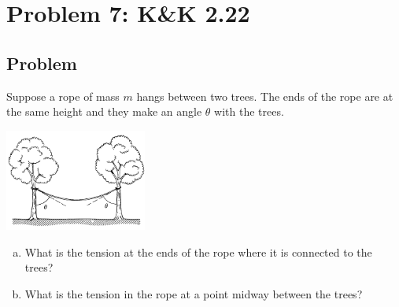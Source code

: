 \documentclass[solutions]{esg8012pset}
\begin{document}
\section*{Problem 7: K\&K 2.22}
\subsection*{Problem}
  Suppose a rope of mass $m$ hangs between two trees. The ends of the rope are at the same height and they make an angle $\theta$ with the trees.
  \begin{center}\includegraphics[width=0.35\textwidth]{ps02_5}\end{center}
  \begin{enumerate}[a)]
    \item What is the tension at the ends of the rope where it is connected to the trees?
    \item What is the tension in the rope at a point midway between the trees?
  \end{enumerate}
\end{document}
